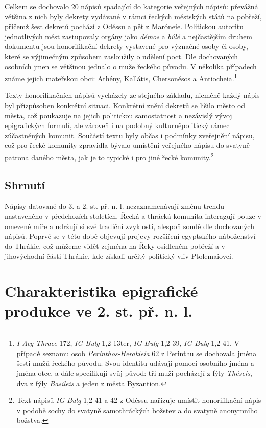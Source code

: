 Celkem se dochovalo 20 nápisů spadající do kategorie veřejných nápisů: převážná většina z nich byly dekrety vydávané v rámci řeckých městských států na pobřeží, přičemž šest dekretů pochází z Odéssu a pět z Maróneie. Politickou autoritu jednotlivých měst zastupovaly orgány jako {\em démos} a {\em búlé} a nejčastějším druhem dokumentu jsou honorifikační dekrety vystavené pro význačné osoby či osoby, které se výjimečným způsobem zasloužily o udělení poct. Dle dochovaných osobních jmen se většinou jednalo o muže řeckého původu. V několika případech známe jejich mateřskou obci: Athény, Kallátis, Chersonésos a Antiocheia.\footnote{{\em I Aeg Thrace} 172, {\em IG Bulg} 1,2 13ter, {\em IG Bulg} 1,2 39, {\em IG Bulg} 1,2 41. V případě seznamu osob {\em Perinthos-Herakleia} 62 z Perinthu se dochovala jména šesti mužů řeckého původu. Svou identitu udávají pomocí osobního jména a jména otce, a dále specifikují svůj původ: tři muži pocházejí z fýly {\em Théseis}, dva z fýly {\em Basileis} a jeden z města Byzantion.}

Texty honorifikačních nápisů vycházely ze stejného základu, nicméně každý nápis byl přizpůsoben konkrétní situaci. Konkrétní znění dekretů se lišilo město od města, což poukazuje na jejich politickou samostatnost a nezávislý vývoj epigrafických formulí, ale zároveň i na podobný kulturněpolitický rámec zúčastněných komunit. Součástí textu byly občas i podmínky zveřejnění nápisu, což pro řecké komunity zpravidla bývalo umístění veřejného nápisu do svatyně patrona daného města, jak je to typické i pro jiné řecké komunity.\footnote{Text nápisů {\em IG Bulg} 1,2 41 a 42 z Odéssu nařizuje umístit honorifikační nápis v podobě sochy do svatyně samothráckých božstev a do svatyně anonymního božstva.}

\subsection[shrnutí-10]{Shrnutí}

Nápisy datované do 3. a 2. st. př. n. l. nezaznamenávají změnu trendu nastaveného v předchozích stoletích. Řecká a thrácká komunita interagují pouze v omezené míře a udržují si své tradiční zvyklosti, alespoň soudě dle dochovaných nápisů. Poprvé se v této době objevují projevy rozšíření egyptského náboženství do Thrákie, což můžeme vidět zejména na Řeky osídleném pobřeží a v jihovýchodní části Thrákie, kde získali určitý politický vliv Ptolemaiovci.

\section[charakteristika-epigrafické-produkce-ve-2.-st.-př.-n.-l.]{Charakteristika epigrafické produkce ve 2. st. př. n. l.}

